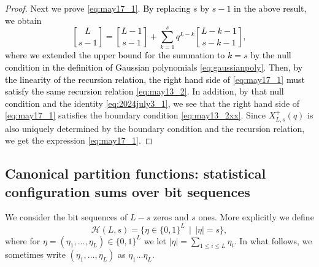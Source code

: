\documentclass[sn-mathphys-num]{sn-jnl}%
\newcommand{\red}[1]{\textcolor{black}{#1}}
\theoremstyle{thmstyleone}%
\theoremstyle{thmstyletwo}%
\theoremstyle{thmstylethree}%
\newtheorem{corollary}[theorem]{Corollary}
\begin{document}
\begin{proof}
Next we prove \eqref{eq:may17_1}.
\red{By replacing $s$ by $s-1$ in the above result, we obtain
\begin{equation*}
{ L \brack s-1 } ={ L-1 \brack s-1 } + \sum_{k=1}^{s} q^{L-k} { L-k-1 \brack s-k-1 },
\end{equation*}
where we extended the upper bound for the summation to $k=s$
by the null condition in the definition of Gaussian polynomials \eqref{eq:gaussianpoly}.
Then, by the linearity of the recursion relation,
the right hand side of \eqref{eq:may17_1} must satisfy the
same recursion relation \eqref{eq:may13_2}.
}
In addition, by that \red{null condition} and
the identity \eqref{eq:2024july3_1}, 
we see that the right hand side of \eqref{eq:may17_1} satisfies 
the boundary condition \eqref{eq:may13_2xx}.
Since $X^+_{L,s}(q)$ is also uniquely determined by
the boundary condition and the recursion relation, 
we get the expression \eqref{eq:may17_1}.
\end{proof}



\subsection{Canonical partition functions: statistical configuration sums over bit sequences}\label{sec4_2}
We consider the bit sequences of
$L-s$ zeros and $s$ ones.
More explicitly we define
\begin{equation}
\mathcal{H} (L,s) = \{ \eta \in \{ 0,1 \}^L \, \mid \, |\eta| = s \},
\end{equation}
where for $\eta = (\eta_1, \dots , \eta_L)\in \{ 0,1 \}^L$
we let $|\eta| =\sum_{1 \leq i \leq L} \eta_i$.
In what follows,
we sometimes write $(\eta_1, \dots , \eta_L)$ as $\eta_1 \dots \eta_L$.
\end{document}
